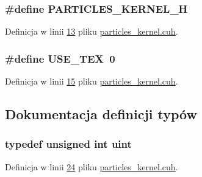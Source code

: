 \hypertarget{particles__kernel_8cuh_a384444f066551f04f65ff94b99aa7091}{
\subsubsection[{P\-A\-R\-T\-I\-C\-L\-E\-S\-\_\-\-K\-E\-R\-N\-E\-L\-\_\-\-H}]{\setlength{\rightskip}{0pt plus 5cm}\#define P\-A\-R\-T\-I\-C\-L\-E\-S\-\_\-\-K\-E\-R\-N\-E\-L\-\_\-\-H}}\label{particles__kernel_8cuh_a384444f066551f04f65ff94b99aa7091}


Definicja w linii \hyperlink{particles__kernel_8cuh_source_l00013}{13} pliku \hyperlink{particles__kernel_8cuh_source}{particles\-\_\-kernel.\-cuh}.

\hypertarget{particles__kernel_8cuh_a0ab211ca35e2616c721fcf2dd4f99c83}{
\subsubsection[{U\-S\-E\-\_\-\-T\-E\-X}]{\setlength{\rightskip}{0pt plus 5cm}\#define U\-S\-E\-\_\-\-T\-E\-X~0}}\label{particles__kernel_8cuh_a0ab211ca35e2616c721fcf2dd4f99c83}


Definicja w linii \hyperlink{particles__kernel_8cuh_source_l00015}{15} pliku \hyperlink{particles__kernel_8cuh_source}{particles\-\_\-kernel.\-cuh}.



\subsection{Dokumentacja definicji typów}
\hypertarget{particles__kernel_8cuh_a91ad9478d81a7aaf2593e8d9c3d06a14}{
\subsubsection[{uint}]{\setlength{\rightskip}{0pt plus 5cm}typedef unsigned int {\bf uint}}}\label{particles__kernel_8cuh_a91ad9478d81a7aaf2593e8d9c3d06a14}


Definicja w linii \hyperlink{particles__kernel_8cuh_source_l00024}{24} pliku \hyperlink{particles__kernel_8cuh_source}{particles\-\_\-kernel.\-cuh}.


